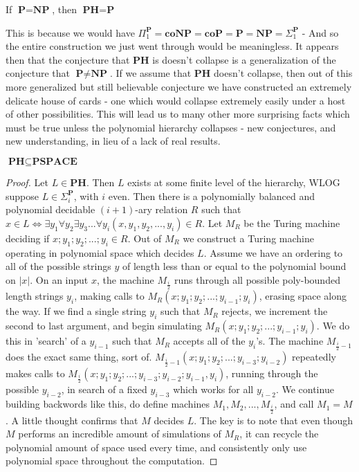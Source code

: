 \begin{corollary}
    If $\textbf{P} = \textbf{NP}$, then $\textbf{PH} = \textbf{P}$
\end{corollary}
This is because we would have $\Pi_1^{\textbf{P}} = \textbf{coNP} = \textbf{coP} = \textbf{P} = \textbf{NP} = \Sigma_1^{\textbf{P}}$ - And so the entire construction we just went through would be meaningless. It appears then that the conjecture that $\textbf{PH}$ is doesn't collapse is a generalization of the conjecture that $\textbf{P} \neq \textbf{NP}$. If we assume that $\textbf{PH}$ doesn't collapse, then out of this more generalized but still believable conjecture we have constructed an extremely delicate house of cards - one which would collapse extremely easily under a host of other possibilities. This will lead us to many other more surprising facts which must be true unless the polynomial hierarchy collapses - new conjectures, and new understanding, in lieu of a lack of real results.
\begin{fact}
    $\textbf{PH} \subseteq \textbf{PSPACE}$
\end{fact}
\begin{proof}
    Let $L \in \textbf{PH}$. Then $L$ exists at some finite level of the hierarchy, WLOG suppose $L \in \Sigma_i^{\textbf{P}}$, with $i$ even. Then there is a polynomially balanced and polynomial decidable $(i+1)$-ary  relation $R$ such that $x \in L \iff \exists y_1 \forall y_2 \exists y_3 ... \forall y_i (x,y_1,y_2,...,y_i) \in R$. Let $M_R$ be the Turing machine deciding if $x;y_1;y_2;...;y_i \in R$. Out of $M_R$ we construct a Turing machine operating in polynomial space which decides $L$. Assume we have an ordering to all of the possible strings $y$ of length less than or equal to the polynomial bound on $|x|$. On an input $x$, the machine $M_{\frac{i}{2}}$ runs through all possible poly-bounded length strings $y_i$, making calls to $M_R(x;y_1;y_2;...;y_{i-1};y_i)$, erasing space along the way. If we find a single string $y_i$ such that $M_R$ rejects, we increment the second to last argument, and begin simulating $M_R(x;y_1;y_2;...;y_{i-1};y_i)$. We do this in 'search' of a $y_{i-1}$ such that $M_R$ accepts all of the $y_i$'s. The machine $M_{\frac{i}{2}-1}$ does the exact same thing, sort of. $M_{\frac{i}{2}-1}(x;y_1;y_2;...;y_{i-3};y_{i-2})$ repeatedly makes calls to $M_{\frac{i}{2}}(x;y_1;y_2;...;y_{i-3};y_{i-2};y_{i-1},y_i)$, running through the possible $y_{i-2}$, in search of a fixed $y_{i-3}$ which works for all $y_{i-2}$. We continue building backwords like this, do define machines $M_1, M_2,...,M_{\frac{i}{2}}$, and call $M_1 = M$. A little thought confirms that $M$ decides $L$. The key is to note that even though $M$ performs an incredible amount of simulations of $M_R$, it can recycle the polynomial amount of space used every time, and consistently only use polynomial space throughout the computation.
\end{proof}

